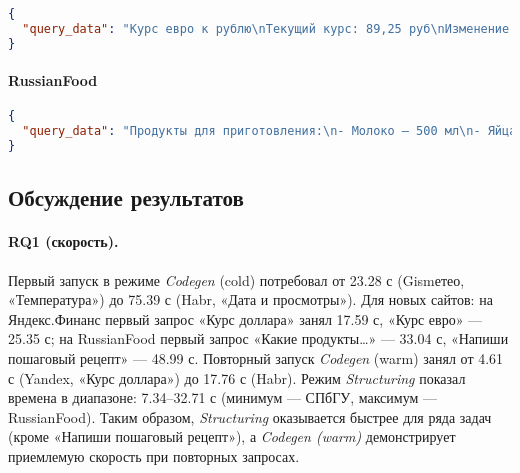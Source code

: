 \begin{lstlisting}[language=json,breaklines, keepspaces=true]
{
  "query_data": "Курс евро к рублю\nТекущий курс: 89,25 руб\nИзменение за день: −3,59 руб (3,86%)\nОбновлено: 31 мая 2025 г.\n"
}
\end{lstlisting}

\paragraph{RussianFood}
\begin{lstlisting}[language=json,breaklines, keepspaces=true]
{
  "query_data": "Продукты для приготовления:\n- Молоко — 500 мл\n- Яйца — 2–3 шт.\n- Масло растительное — 1 ст. ложка (+для смазывания сковороды)\n- Мука — 200 г\n- Сахар — 1 ст. ложка\n- Соль — 1 щепотка\n- Масло сливочное — 1 ст. ложка (для смазывания)\n"
}
\end{lstlisting}


\subsection{Обсуждение результатов}

\paragraph{RQ1 (скорость).}
Первый запуск в режиме \emph{Codegen} (cold) потребовал от 23.28 с (Gismетео, «Температура») до 75.39 с (Habr, «Дата и просмотры»). Для новых сайтов: на Яндекс.Финанс первый запрос «Курс доллара» занял 17.59 с, «Курс евро» — 25.35 с; на RussianFood первый запрос «Какие продукты…» — 33.04 с, «Напиши пошаговый рецепт» — 48.99 с. Повторный запуск \emph{Codegen} (warm) занял от 4.61 с (Yandex, «Курс доллара») до 17.76 с (Habr). Режим \emph{Structuring} показал времена в диапазоне: 7.34–32.71 с (минимум — СПбГУ, максимум — RussianFood). Таким образом, \emph{Structuring} оказывается быстрее для ряда задач (кроме «Напиши пошаговый рецепт»), а \emph{Codegen (warm)} демонстрирует приемлемую скорость при повторных запросах.

